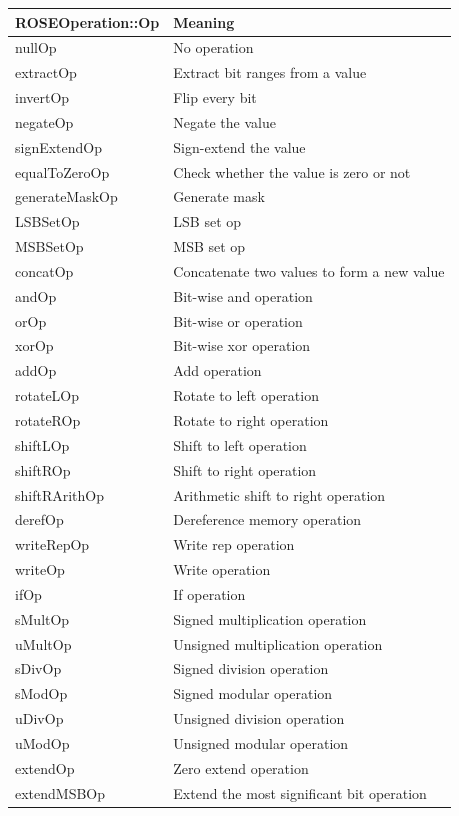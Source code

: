 \begin{center}
\begin{tabular}{ll}
\toprule
ROSEOperation::Op & Meaning \\
\midrule
    nullOp  & No operation \\
    extractOp & Extract bit ranges from a value \\
    invertOp & Flip every bit \\
    negateOp & Negate the value \\
    signExtendOp & Sign-extend the value \\
    equalToZeroOp & Check whether the value is zero or not \\
    generateMaskOp & Generate mask \\
    LSBSetOp & LSB set op\\
    MSBSetOp & MSB set op \\
    concatOp & Concatenate two values to form a new value \\
    andOp & Bit-wise and operation \\
    orOp & Bit-wise or operation \\
    xorOp & Bit-wise xor operation \\
    addOp & Add operation \\
    rotateLOp & Rotate to left operation \\
    rotateROp & Rotate to right operation \\
    shiftLOp & Shift to left operation \\
    shiftROp & Shift to right operation \\
    shiftRArithOp & Arithmetic shift to right operation \\
    derefOp  & Dereference memory operation \\
    writeRepOp & Write rep operation\\
    writeOp & Write operation\\
    ifOp & If operation \\
    sMultOp & Signed multiplication operation \\
    uMultOp & Unsigned multiplication operation \\
    sDivOp & Signed division operation \\
    sModOp & Signed modular operation \\
    uDivOp & Unsigned division operation \\
    uModOp & Unsigned modular operation \\
    extendOp & Zero extend operation \\
    extendMSBOp & Extend the most significant bit operation \\
\bottomrule
\end{tabular}
\end{center}


